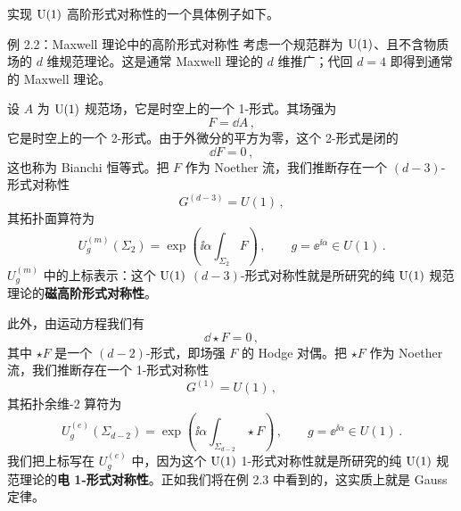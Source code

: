 实现 $\mathrm{U}(1)$ 高阶形式对称性的一个具体例子如下。

\begin{examplebox}{例 2.2：Maxwell 理论中的高阶形式对称性}
考虑一个规范群为 $\mathrm{U}(1)$、且不含物质场的 $d$ 维规范理论。这是通常 Maxwell 理论的 $d$ 维推广；代回 $d=4$ 即得到通常的 Maxwell 理论。

设 $A$ 为 $\mathrm{U}(1)$ 规范场，它是时空上的一个 1-形式。其场强为
\begin{equation}
  F = \dd A\,, \tag{2.49}
\end{equation}
它是时空上的一个 2-形式。由于外微分的平方为零，这个 2-形式是闭的
\begin{equation}
  \dd F = 0\,, \tag{2.50}
\end{equation}
这也称为 Bianchi 恒等式。把 $F$ 作为 Noether 流，我们推断存在一个 $(d-3)$-形式对称性
\begin{equation}
  G^{(d-3)} = U(1)\,, \tag{2.51}
\end{equation}
其拓扑面算符为
\begin{equation}
  U_g^{(m)}(\Sigma_2) = \exp\left(\ii\alpha\int_{\Sigma_2} F\right)\,, \qquad g = \ee^{\ii\alpha}\in U(1)\,. \tag{2.52}
\end{equation}
$U_g^{(m)}$ 中的上标表示：这个 $\mathrm{U}(1)$ $(d-3)$-形式对称性就是所研究的纯 $\mathrm{U}(1)$ 规范理论的\textbf{磁高阶形式对称性}。

此外，由运动方程我们有
\begin{equation}
  \dd\star F = 0\,, \tag{2.53}
\end{equation}
其中 $\star F$ 是一个 $(d-2)$-形式，即场强 $F$ 的 Hodge 对偶。把 $\star F$ 作为 Noether 流，我们推断存在一个 1-形式对称性
\begin{equation}
  G^{(1)} = U(1)\,, \tag{2.54}
\end{equation}
其拓扑余维-2 算符为
\begin{equation}
  U_g^{(e)}(\Sigma_{d-2}) = \exp\left(\ii\alpha\int_{\Sigma_{d-2}} \star F\right)\,, \qquad g = \ee^{\ii\alpha}\in U(1)\,. \tag{2.55}
\end{equation}
我们把上标写在 $U_g^{(e)}$ 中，因为这个 $\mathrm{U}(1)$ 1-形式对称性就是所研究的纯 $\mathrm{U}(1)$ 规范理论的\textbf{电 1-形式对称性}。正如我们将在例 2.3 中看到的，这实质上就是 Gauss 定律。
\end{examplebox}


